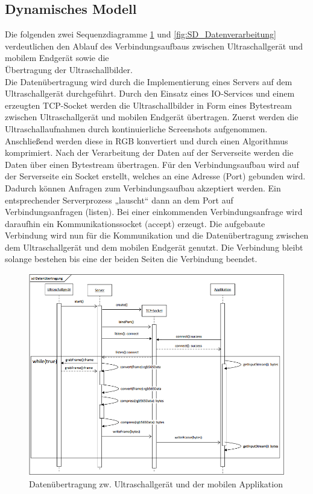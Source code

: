 \subsection{Dynamisches Modell}
Die folgenden zwei Sequenzdiagramme \ref{fig:SD_Datenuebertragung} und \ref{fig:SD_Datenverarbeitung}  verdeutlichen den Ablauf des Verbindungsaufbaus zwischen Ultraschallgerät und mobilem Endgerät sowie die \\ Übertragung der Ultraschallbilder.\\
Die Datenübertragung wird durch die Implementierung eines Servers auf dem Ultraschallgerät durchgeführt. Durch den Einsatz eines IO-Services und einem erzeugten TCP-Socket werden die Ultraschallbilder in Form eines Bytestream zwischen Ultraschallgerät und mobilen Endgerät übertragen. Zuerst werden die Ultraschallaufnahmen durch kontinuierliche Screenshots aufgenommen. Anschließend werden diese in RGB konvertiert und durch einen Algorithmus komprimiert. Nach der Verarbeitung der Daten auf der Serverseite werden die Daten über einen Bytestream übertragen. Für den Verbindungsaufbau wird auf der Serverseite ein Socket erstellt, welches an eine Adresse (Port) gebunden wird. Dadurch können Anfragen zum Verbindungsaufbau akzeptiert werden. Ein entsprechender Serverprozess „lauscht“ dann an dem Port auf Verbindungsanfragen (listen). Bei einer einkommenden Verbindungsanfrage wird daraufhin ein Kommunikationssocket (accept) erzeugt. Die aufgebaute Verbindung wird nun für die Kommunikation und die Datenübertragung zwischen dem Ultraschallgerät und dem mobilen Endgerät genutzt. Die Verbindung bleibt solange bestehen bis eine der beiden Seiten die Verbindung beendet. 

\begin{figure}[H] 
\centering
\includegraphics[width=1\textwidth]{Bilder/objektorientierteAnalyseundEntwurf/SD_Datenuebertragung}
\caption{{\small Datenübertragung zw. Ultraschallgerät und der mobilen Applikation}}
\label{fig:SD_Datenuebertragung}
\end{figure}

